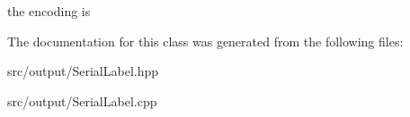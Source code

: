 the encoding is 
\begin{DoxyCode}{0}
\end{DoxyCode}
 

The documentation for this class was generated from the following files\+:\begin{DoxyCompactItemize}
\item 
src/output/Serial\+Label.\+hpp\item 
src/output/Serial\+Label.\+cpp\end{DoxyCompactItemize}
